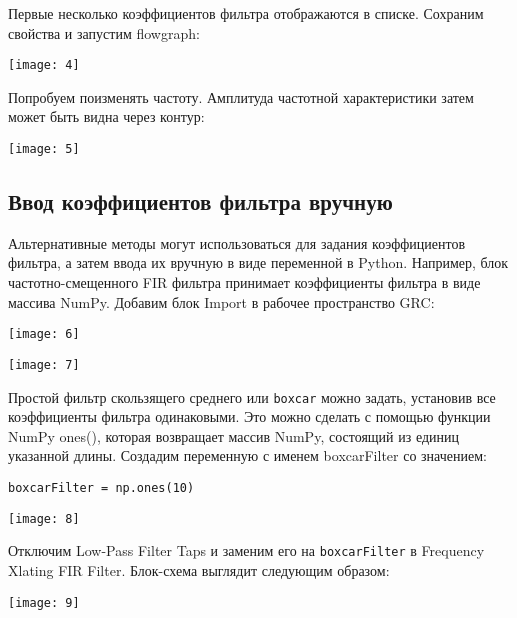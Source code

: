Первые несколько коэффициентов фильтра отображаются в списке. Сохраним свойства и запустим flowgraph:

\begin{center}
    \texttt{[image: 4]}
\end{center}

Попробуем поизменять частоту. Амплитуда частотной характеристики затем может быть видна через контур:

\begin{center}
    \texttt{[image: 5]}
\end{center}

\subsection{Ввод коэффициентов фильтра вручную}

Альтернативные методы могут использоваться для задания коэффициентов фильтра, а затем ввода их вручную в виде переменной в Python. Например, блок частотно-смещенного FIR фильтра принимает коэффициенты фильтра в виде массива NumPy. Добавим блок Import в рабочее пространство GRC:

\begin{center}
    \texttt{[image: 6]}
\end{center}

\begin{center}
    \texttt{[image: 7]}
\end{center}

Простой фильтр скользящего среднего или \verb|boxcar| можно задать, установив все коэффициенты фильтра одинаковыми. Это можно сделать с помощью функции NumPy ones(), которая возвращает массив NumPy, состоящий из единиц указанной длины. Создадим переменную с именем boxcarFilter со значением:

\begin{verbatim}
boxcarFilter = np.ones(10)
\end{verbatim}

\begin{center}
    \texttt{[image: 8]}
\end{center}

Отключим Low-Pass Filter Taps и заменим его на \verb|boxcarFilter| в Frequency Xlating FIR Filter. Блок-схема выглядит следующим образом:

\begin{center}
    \texttt{[image: 9]}
\end{center}

